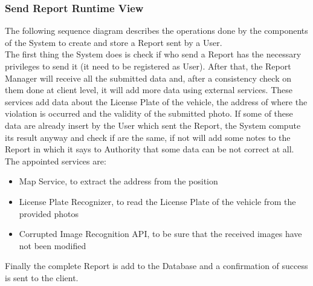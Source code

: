 \subsubsection{Send Report Runtime View}
The following sequence diagram describes the operations done by the components of the System to create and store a Report sent by a User.\\
The first thing the System does is check if who send a Report has the necessary privileges to send it (it need to be registered as User). After that, the Report Manager will receive all the submitted data and, after a consistency check on them done at client level, it will add more data using external services. These services add data about the License Plate of the vehicle, the address of where the violation is occurred and the validity of the submitted photo. If some of these data are already insert by the User which sent the Report, the System compute its result anyway and check if are the same, if not will add some notes to the Report in which it says to Authority that some data can be not correct at all.\\
The appointed services are:
\begin{itemize}
    \item Map Service, to extract the address from the position
    \item License Plate Recognizer, to read the License Plate of the vehicle from the provided photos
    \item Corrupted Image Recognition API, to be sure that the received images have not been modified
\end{itemize}

Finally the complete Report is add to the Database and a confirmation of success is sent to the client.

